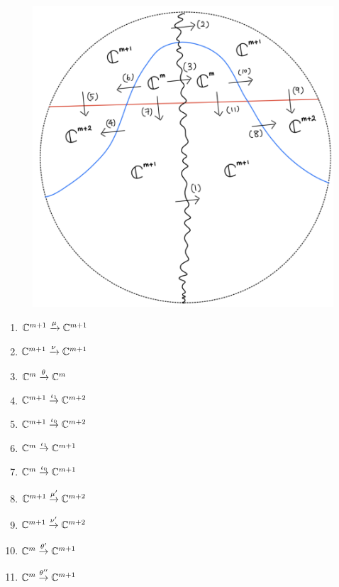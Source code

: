 \begin{figure}[H]
    \centering
    \includegraphics[scale = 0.45]{diagrams/lemma3/21.png} 
    \caption{}
    \label{fig:your-label}
\end{figure}
\begin{enumerate}[label = (\arabic*)]
\item $\mathbb{C}^{m+1} \xrightarrow{\mu} \mathbb{C}^{m+1}$

\item $\mathbb{C}^{m+1} \xrightarrow{\nu} \mathbb{C}^{m+1}$

\item $\mathbb{C}^{m} \xrightarrow{\theta} \mathbb{C}^{m}$

\item $\mathbb{C}^{m+1} \overset{\iota_1}{\rightarrow} \mathbb{C}^{m+2}$

\item $\mathbb{C}^{m+1} \overset{\iota_0}{\rightarrow} \mathbb{C}^{m+2}$

\item $\mathbb{C}^{m} \overset{\iota_1}{\rightarrow} \mathbb{C}^{m+1}$

\item $\mathbb{C}^{m} \overset{\iota_0}{\rightarrow} \mathbb{C}^{m+1}$

\item $\mathbb{C}^{m+1} \overset{\mu'}{\rightarrow} \mathbb{C}^{m+2}$

\item $\mathbb{C}^{m+1} \overset{\nu'}{\rightarrow} \mathbb{C}^{m+2}$

\item $\mathbb{C}^{m} \overset{\theta'}{\rightarrow} \mathbb{C}^{m+1}$

\item $\mathbb{C}^{m} \overset{\theta''}{\rightarrow} \mathbb{C}^{m+1}$
\end{enumerate}

